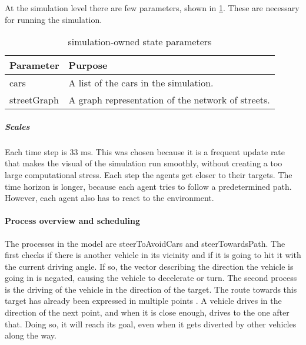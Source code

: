 	At the simulation level there are few parameters, shown in \cref{tab:par:method:model:overview:state:highlevel:sim}. These are necessary for running the simulation.
	
	\begin{table}[H]
		\centering
		\begin{tabular}{|l | p{10.5cm} |}
			\hline
			Parameter				& Purpose \\ \hline \hline
			cars 					& A list of the cars in the simulation. \\ \hline
			streetGraph		 		& A graph representation of the network of streets. \\ \hline
		\end{tabular}
		\caption{simulation-owned state parameters}
		\label{tab:par:method:model:overview:state:highlevel:sim}
	\end{table}


	\subparagraph{Scales}


	Each time step is 33 ms. This was chosen because it is a frequent update rate that makes the visual of the simulation run smoothly, without creating a too large computational stress. Each step the agents get closer to their targets. The time horizon is longer, because each agent tries to follow a predetermined path. However, each agent also has to react to the environment. 



\paragraph{Process overview and scheduling}
\label{par:method:model:overview:process}

The processes in the model are steerToAvoidCars and steerTowardsPath. 
The first checks if there is another vehicle in its vicinity and if it is going to hit it with the current driving angle. If so, the vector describing the direction the vehicle is going in is negated, causing the vehicle to decelerate or turn.
The second process is the driving of the vehicle in the direction of the target. The route towards this target has already been expressed in multiple points . A vehicle drives in the direction of the next point, and when it is close enough, drives to the one after that. Doing so, it will reach its goal, even when it gets diverted by other vehicles along the way.

